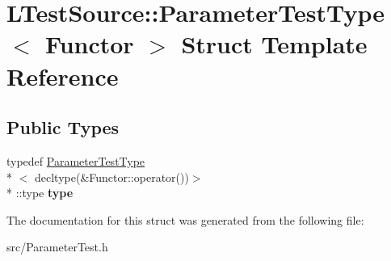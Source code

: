 \hypertarget{struct_l_test_source_1_1_parameter_test_type}{\section{L\-Test\-Source\-:\-:Parameter\-Test\-Type$<$ Functor $>$ Struct Template Reference}
\label{struct_l_test_source_1_1_parameter_test_type}
}
\subsection*{Public Types}
\begin{DoxyCompactItemize}
\item 
\hypertarget{struct_l_test_source_1_1_parameter_test_type_a731f6ca2a1f8bd199ce36a70ab8a60c1}{typedef \hyperlink{struct_l_test_source_1_1_parameter_test_type}{Parameter\-Test\-Type}\\*
$<$ decltype(\&Functor\-::operator())$>$\\*
\-::type {\bfseries type}}\label{struct_l_test_source_1_1_parameter_test_type_a731f6ca2a1f8bd199ce36a70ab8a60c1}

\end{DoxyCompactItemize}


The documentation for this struct was generated from the following file\-:\begin{DoxyCompactItemize}
\item 
src/Parameter\-Test.\-h\end{DoxyCompactItemize}

